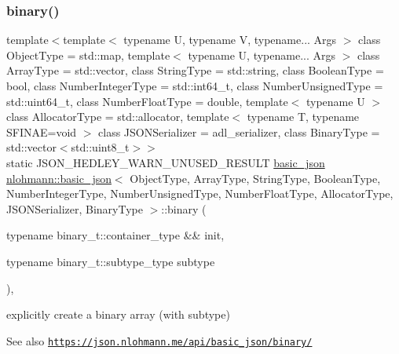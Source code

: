 \subsubsection{\texorpdfstring{binary()}{binary()}\hspace{0.1cm}{\footnotesize\ttfamily [4/4]}}
{\footnotesize\ttfamily template$<$template$<$ typename U, typename V, typename... Args $>$ class Object\+Type = std\+::map, template$<$ typename U, typename... Args $>$ class Array\+Type = std\+::vector, class String\+Type  = std\+::string, class Boolean\+Type  = bool, class Number\+Integer\+Type  = std\+::int64\+\_\+t, class Number\+Unsigned\+Type  = std\+::uint64\+\_\+t, class Number\+Float\+Type  = double, template$<$ typename U $>$ class Allocator\+Type = std\+::allocator, template$<$ typename T, typename S\+F\+I\+N\+A\+E=void $>$ class J\+S\+O\+N\+Serializer = adl\+\_\+serializer, class Binary\+Type  = std\+::vector$<$std\+::uint8\+\_\+t$>$$>$ \\
static J\+S\+O\+N\+\_\+\+H\+E\+D\+L\+E\+Y\+\_\+\+W\+A\+R\+N\+\_\+\+U\+N\+U\+S\+E\+D\+\_\+\+R\+E\+S\+U\+LT \hyperlink{classnlohmann_1_1basic__json}{basic\+\_\+json} \hyperlink{classnlohmann_1_1basic__json}{nlohmann\+::basic\+\_\+json}$<$ Object\+Type, Array\+Type, String\+Type, Boolean\+Type, Number\+Integer\+Type, Number\+Unsigned\+Type, Number\+Float\+Type, Allocator\+Type, J\+S\+O\+N\+Serializer, Binary\+Type $>$\+::binary (\begin{DoxyParamCaption}\item[{typename binary\+\_\+t\+::container\+\_\+type \&\&}]{init,  }\item[{typename binary\+\_\+t\+::subtype\+\_\+type}]{subtype }\end{DoxyParamCaption})\hspace{0.3cm}{\ttfamily [inline]}, {\ttfamily [static]}}



explicitly create a binary array (with subtype) 

\begin{DoxySeeAlso}{See also}
\href{https://json.nlohmann.me/api/basic_json/binary/}{\tt https\+://json.\+nlohmann.\+me/api/basic\+\_\+json/binary/} 
\end{DoxySeeAlso}
\mbox{\label{classnlohmann_1_1basic__json_ae508c13e3ad6ce445bcaf24a2bc7d039}} 
